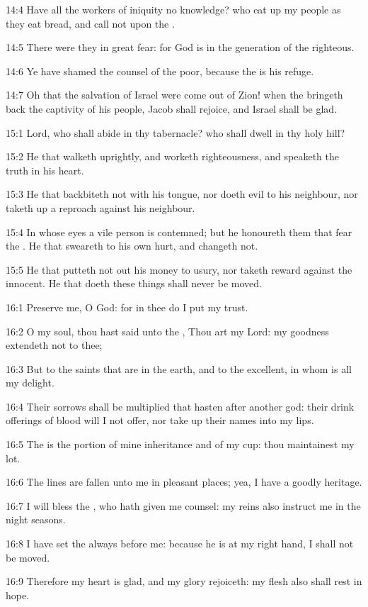 14:4 Have all the workers of iniquity no knowledge? who eat up my
people as they eat bread, and call not upon the \LORD.

14:5 There were they in great fear: for God is in the generation of
the righteous.

14:6 Ye have shamed the counsel of the poor, because the \LORD is his
refuge.

14:7 Oh that the salvation of Israel were come out of Zion! when the
\LORD bringeth back the captivity of his people, Jacob shall rejoice,
and Israel shall be glad.



15:1 Lord, who shall abide in thy tabernacle? who shall dwell in thy
holy hill?

15:2 He that walketh uprightly, and worketh righteousness, and
speaketh the truth in his heart.

15:3 He that backbiteth not with his tongue, nor doeth evil to his
neighbour, nor taketh up a reproach against his neighbour.

15:4 In whose eyes a vile person is contemned; but he honoureth them
that fear the \LORD. He that sweareth to his own hurt, and changeth
not.

15:5 He that putteth not out his money to usury, nor taketh reward
against the innocent. He that doeth these things shall never be moved.



16:1 Preserve me, O God: for in thee do I put my trust.

16:2 O my soul, thou hast said unto the \LORD, Thou art my Lord: my
goodness extendeth not to thee;

16:3 But to the saints that are in the earth, and to the excellent, in
whom is all my delight.

16:4 Their sorrows shall be multiplied that hasten after another god:
their drink offerings of blood will I not offer, nor take up their
names into my lips.

16:5 The \LORD is the portion of mine inheritance and of my cup: thou
maintainest my lot.

16:6 The lines are fallen unto me in pleasant places; yea, I have a
goodly heritage.

16:7 I will bless the \LORD, who hath given me counsel: my reins also
instruct me in the night seasons.

16:8 I have set the \LORD always before me: because he is at my right
hand, I shall not be moved.

16:9 Therefore my heart is glad, and my glory rejoiceth: my flesh also
shall rest in hope.


